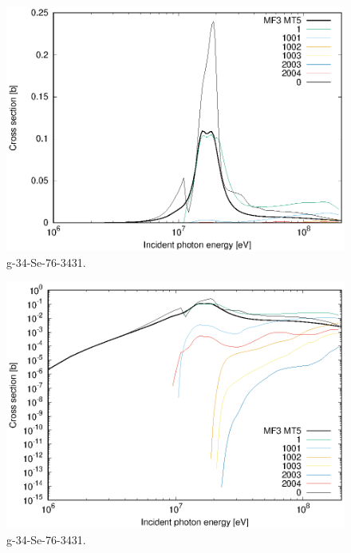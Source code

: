 \begin{figure}
 \includegraphics[width=\linewidth]{eps/g_34-Se-76_3431.eps}
  \caption{g-34-Se-76-3431.}
\end{figure}
\begin{figure}
 \includegraphics[width=\linewidth]{eps-log/g_34-Se-76_3431.eps}
 \caption{g-34-Se-76-3431.}
\end{figure}
\newpage \clearpage

